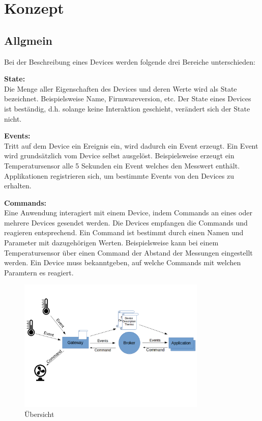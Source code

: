 \chapter{Konzept}
\label{chap:konzept}


\section{Allgmein}
Bei der Beschreibung eines Devices werden folgende drei Bereiche unterschieden:


\textbf{State:} \\
Die Menge aller Eigenschaften des Devices und deren Werte wird als State bezeichnet. Beispielsweise Name, Firmwareversion, etc. Der State eines Devices ist beständig, d.h. solange keine Interaktion geschieht, verändert sich der State nicht.


\textbf{Events:} \\
Tritt auf dem Device ein Ereignis ein, wird dadurch ein Event erzeugt. Ein Event wird grundsätzlich vom Device selbst ausgelöst. Beispielsweise erzeugt ein Temperatursensor alle 5 Sekunden ein Event welches den Messwert enthält. Applikationen registrieren sich, um bestimmte Events von den Devices zu erhalten.


\textbf{Commands:} \\
Eine Anwendung interagiert mit einem Device, indem Commands an eines oder mehrere Devices gesendet werden. Die Devices empfangen die Commands und reagieren entsprechend. Ein Command ist bestimmt durch einen Namen und Parameter mit dazugehörigen Werten. 
Beispielsweise kann bei einem Temperatursensor über einen Command  der Abstand der Messungen eingestellt werden.
Ein Device muss bekanntgeben, auf welche Commands mit welchen Paramtern es reagiert.

\begin{figure}[H]
	\centering
		\includegraphics[width=0.8\textwidth]{diag/Overview.png}
	\caption{\label{fig:overview}Übersicht }
\end{figure}


